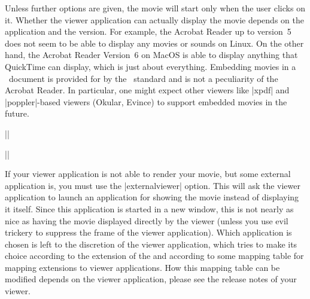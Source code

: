 \begin{command}{\movie{}}
  Unless further options are given, the movie will start only when the user clicks on it. Whether the viewer application can actually display the movie depends on the application and the version. For example, the Acrobat Reader up to version~5 does not seem to be able to display any movies or sounds on Linux. On the other hand, the Acrobat Reader Version~6 on MacOS is able to display anything that QuickTime can display, which is just about everything. Embedding movies in a \pdf\ document is provided for by the \pdf\ standard and is not a peculiarity of the Acrobat Reader. In particular, one might expect other viewers like |xpdf| and |poppler|-based viewers (Okular, Evince) to support embedded movies in the future.

  \example
  ||

  \example
  ||

  If your viewer application is not able to render your movie, but some external application is, you must use the |externalviewer| option. This will ask the viewer application to launch an application for showing the movie instead of displaying it itself. Since this application is started in a new window, this is not nearly as nice as having the movie displayed directly by the viewer (unless you use evil trickery to suppress the frame of the viewer application). Which application is chosen is left to the discretion of the viewer application, which tries to make its choice according to the extension of the  and according to some mapping table for mapping extensions to viewer applications. How this mapping table can be modified depends on the viewer application, please see the release notes of your viewer.


\end{command}
